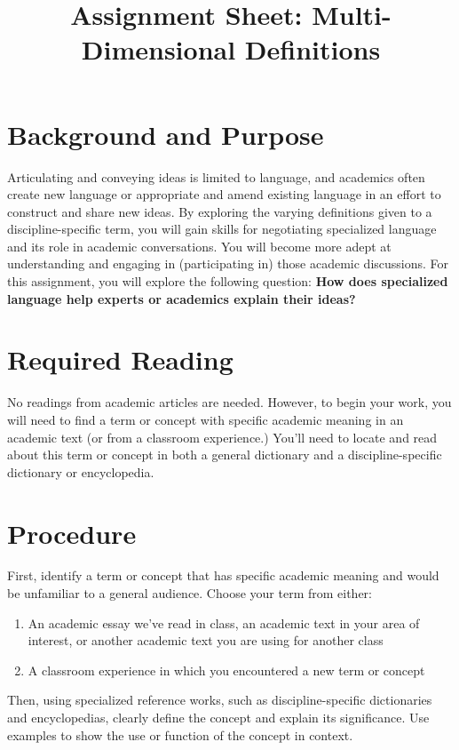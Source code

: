 \documentclass[10pt, oneside,twocolumn]{amsart}	%
\title[Multi-Dimensional Definitions]{Assignment Sheet: Multi-Dimensional Definitions}
\begin{document}
%
\thispagestyle{empty}
\setlength{\columnsep}{.125in}

\section{Background and Purpose} %
\label{sec:background}
Articulating and conveying ideas is limited to language, and academics often create new language or appropriate and amend existing language in an effort to construct and share new ideas.  By exploring the varying definitions given to a discipline-specific term, you will gain skills for negotiating specialized language and its role in academic conversations.  You will become more adept at understanding and engaging in (participating in) those academic discussions. For this assignment, you will explore the following question:  \textbf{How does specialized language help experts or academics explain their ideas?}

\section{Required Reading} %
\label{sec:readings}
No readings from academic articles are needed. However, to begin your work, you will need to find a term or concept with specific academic meaning in an academic text (or from a classroom experience.)  You’ll need to locate and read about this term or concept in both a general dictionary and a discipline-specific dictionary or encyclopedia. 

\section{Procedure} %
\label{sec:procedure}
First, identify a term or concept that has specific academic meaning and would be unfamiliar to a general audience.  Choose your term from either:
\begin{enumerate}
	\item An academic essay we’ve read in class, an academic text in your area of interest, or another academic text you are using for another class 

\item A classroom experience in which you encountered a new term or concept
\end{enumerate}
Then, using specialized reference works, such as discipline-specific dictionaries and encyclopedias, clearly define the concept and explain its significance.  Use examples to show the use or function of the concept in context.
\end{document}
